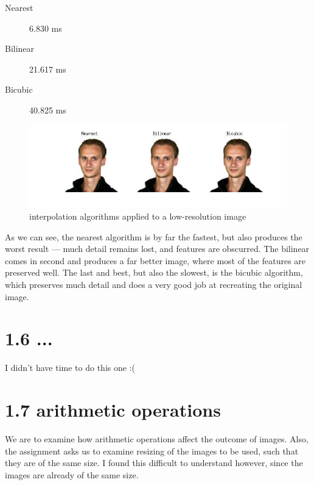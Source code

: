 \documentclass[11pt]{article}
\begin{document}
\begin{multicols}{3}

    \begin{description}
        \item[Nearest] 6.830 ms
    \end{description}

    \columnbreak

    \begin{description}
        \item[Bilinear] 21.617 ms
    \end{description}

    \columnbreak

    \begin{description}
        \item[Bicubic] 40.825 ms
    \end{description}

\end{multicols}

\begin{figure}[H]
    \hspace{-3.5cm}\includegraphics[scale=0.9]{figures/1-5_2.jpg}
    \caption{interpolation algorithms applied to a low-resolution image}
\end{figure}

As we can see, the nearest algorithm is by far the fastest, but also produces
the worst result --- much detail remains lost, and features are obscurred. The
bilinear comes in second and produces a far better image, where most of the
features are preserved well. The last and best, but also the slowest, is the
bicubic algorithm, which preserves much detail and does a very good job at
recreating the original image.


\section{1.6 \mdseries ...}
\label{sec:1-6}
I didn't have time to do this one :(


\newpage
\section{1.7 \mdseries arithmetic operations}
\label{sec:1-7}
We are to examine how arithmetic operations affect the outcome of images.
Also, the assignment asks us to examine resizing of the images to be used,
such that they are of the same size. I found this difficult to understand
however, since the images are already of the same size.
\end{document}
